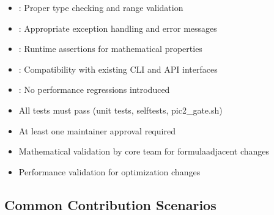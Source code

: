 \documentclass[letterpaper,10pt,english]{sphinxmanual}
\begin{document}
\sphinxAtStartPar
{}
\begin{itemize}
\item {} 
\sphinxAtStartPar
{}: Proper type checking and range validation

\item {} 
\sphinxAtStartPar
{}: Appropriate exception handling and error messages

\item {} 
\sphinxAtStartPar
{}: Runtime assertions for mathematical properties

\item {} 
\sphinxAtStartPar
{}: Compatibility with existing CLI and API interfaces

\item {} 
\sphinxAtStartPar
{}: No performance regressions introduced

\end{itemize}

\sphinxAtStartPar
{}
\begin{itemize}
\item {} 
\sphinxAtStartPar
All tests must pass (unit tests, self\sphinxhyphen{}tests, pic2\_gate.sh)

\item {} 
\sphinxAtStartPar
At least one maintainer approval required

\item {} 
\sphinxAtStartPar
Mathematical validation by core team for formula\sphinxhyphen{}adjacent changes

\item {} 
\sphinxAtStartPar
Performance validation for optimization changes

\end{itemize}


\subsection{Common Contribution Scenarios}
\label{\detokenize{contributing:common-contribution-scenarios}}
\sphinxAtStartPar
{}
\end{document}
